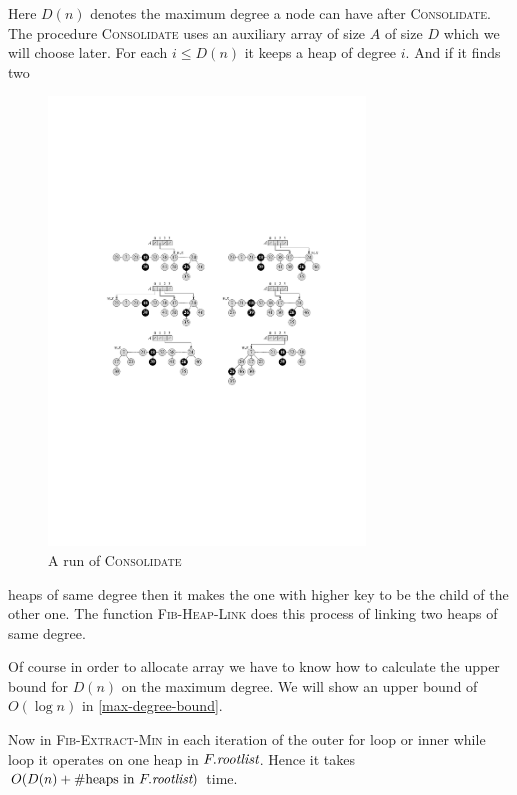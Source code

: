 Here $D(n)$ denotes the maximum degree a node can have after \textsc{Consolidate}. The procedure \textsc{Consolidate} uses an auxiliary array of size $A$ of size $D$ which we will choose later. For each $i\leq D(n)$ it keeps a heap of degree $i$. And if it finds two 
\begin{figure}[h!]
	\centering
	\includegraphics[width=0.75\textwidth]{images/Fibheap2.pdf}
	\caption{A run of \textsc{Consolidate}}
\end{figure}
heaps of same degree then it makes the one with higher key to be the child of the other one. The function \textsc{Fib-Heap-Link} does this process of linking two heaps of same degree.\parinn

Of course in order to allocate array we have to know how to calculate the upper bound for $D(n)$ on the maximum degree. We will show an upper bound of $O(\log n)$ in \autoref{max-degree-bound}.

Now in \textsc{Fib-Extract-Min} in each iteration of the outer for loop or inner while loop it operates on one heap in $F.\emph{rootlist}$. Hence it takes $O(D(n)+\#\text{heaps in $F.\emph{rootlist}$})$ time.


